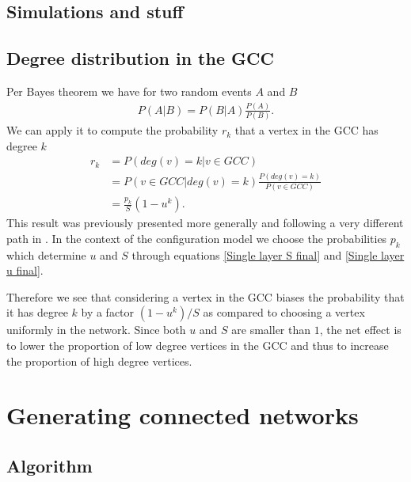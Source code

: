 \documentclass[
11pt, %
english, %
singlespacing, %
nolistspacing, %
liststotoc, %
headsepline, %
]{MastersDoctoralThesis} %
\begin{document}
\subsection{Simulations and stuff}


\subsection{Degree distribution in the GCC}
\label{Section: Degree distribution in the GCC}

Per Bayes theorem we have for two random events $A$ and $B$
\begin{align}
	P(A | B) = P(B | A) \frac{P(A)}{P(B)}. \label{Bayes theorem}
\end{align}
We can apply it to compute the probability $r_k$ that a vertex in the GCC has degree $k$
\begin{align}
	r_k &= P\left(deg(v) = k | v \in GCC\right)\\
	&= P(v \in GCC | deg(v) = k) \frac{P(deg(v) = k)}{P(v \in GCC)} \\
	&= \frac{p_k}{S} (1 - u^k). \label{Degree distribution in GCC}
\end{align}
This result was previously presented more generally and following a very different path in \cite{bauer2002maximal}. In the context of the configuration model we choose the probabilities $p_k$ which determine $u$ and $S$ through equations \eqref{Single layer S final} and \eqref{Single layer u final}.

Therefore we see that considering a vertex in the GCC biases the probability that it has degree $k$ by a factor $(1 - u^k)/S$ as compared to choosing a vertex uniformly in the network. Since both $u$ and $S$ are smaller than $1$, the net effect is to lower the proportion of low degree vertices in the GCC and thus to increase the proportion of high degree vertices.

\section{Generating connected networks}
\label{Section: Generating connected networks}

\subsection{Algorithm}
\end{document}
